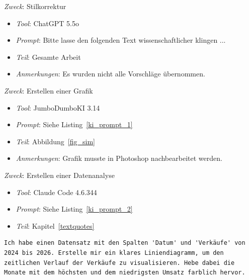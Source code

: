 \documentclass[conference,compsoc,final,a4paper]{IEEEtran}
\begin{document}

\vspace{1em}
\begin{footnotesize}
  \raggedright
  \textit{Zweck}: Stilkorrektur
  \begin{itemize}
    \item \textit{Tool}: ChatGPT 5.5o
    \item \textit{Prompt}: Bitte lasse den folgenden Text wissenschaftlicher klingen ...
    \item \textit{Teil}: Gesamte Arbeit
    \item \textit{Anmerkungen}: Es wurden nicht alle Vorschläge übernommen.
  \end{itemize}

  \textit{Zweck}: Erstellen einer Grafik
  \begin{itemize}
    \item \textit{Tool}: JumboDumboKI 3.14
    \item \textit{Prompt}: Siehe Listing~\ref{ki_prompt_1}
    \item \textit{Teil}: Abbildung~\ref{fig_sim}
    \item \textit{Anmerkungen}: Grafik musste in Photoshop nachbearbeitet werden.
  \end{itemize}

  \textit{Zweck}: Erstellen einer Datenanalyse
  \begin{itemize}
    \item \textit{Tool}: Claude Code 4.6.344
    \item \textit{Prompt}: Siehe Listing~\ref{ki_prompt_2}
    \item \textit{Teil}: Kapitel~\ref{textquotes}
  \end{itemize}

  \end{footnotesize}

  \FloatBarrier

  \begin{lstlisting}[float,label={ki_prompt_1},caption={Prompt zur Grafikerstellung},breakindent=0pt]
  Ich habe einen Datensatz mit den Spalten 'Datum' und 'Verkäufe' von 2024 bis 2026. Erstelle mir ein klares Liniendiagramm, um den zeitlichen Verlauf der Verkäufe zu visualisieren. Hebe dabei die Monate mit dem höchsten und dem niedrigsten Umsatz farblich hervor.
  \end{lstlisting}
\end{document}

